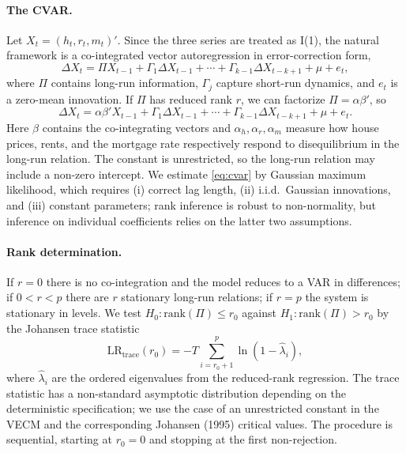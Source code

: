 \documentclass[12pt]{article}
\begin{document}
\paragraph{The CVAR.} Let $X_t = (h_t, r_t, m_t)'$. Since the three series are treated as I(1), the natural framework is a co-integrated vector autoregression in error-correction form,
\begin{equation}
    \Delta X_t = \Pi X_{t-1} + \Gamma_1 \Delta X_{t-1} + \cdots + \Gamma_{k-1}\Delta X_{t-k+1} + \mu + e_t,
\end{equation}
where $\Pi$ contains long-run information, $\Gamma_j$ capture short-run dynamics, and $e_t$ is a zero-mean innovation. If $\Pi$ has reduced rank $r$, we can factorize $\Pi = \alpha\beta'$, so
\begin{equation}
    \Delta X_t = \alpha\beta'X_{t-1} + \Gamma_1 \Delta X_{t-1} + \cdots + \Gamma_{k-1}\Delta X_{t-k+1} + \mu + e_t.
    \label{eq:cvar}
\end{equation}
Here $\beta$ contains the co-integrating vectors and $\alpha_h, \alpha_r, \alpha_m$ measure how house prices, rents, and the mortgage rate respectively respond to disequilibrium in the long-run relation. The constant is unrestricted, so the long-run relation may include a non-zero intercept. We estimate \eqref{eq:cvar} by Gaussian maximum likelihood, which requires (i) correct lag length, (ii) i.i.d.\ Gaussian innovations, and (iii) constant parameters; rank inference is robust to non-normality, but inference on individual coefficients relies on the latter two assumptions.

\paragraph{Rank determination.} If $r=0$ there is no co-integration and the model reduces to a VAR in differences; if $0<r<p$ there are $r$ stationary long-run relations; if $r=p$ the system is stationary in levels. We test $H_0: \text{rank}(\Pi)\leq r_0$ against $H_1: \text{rank}(\Pi)>r_0$ by the Johansen trace statistic
\[
\mathrm{LR}_{\mathrm{trace}}(r_0) = -T\sum_{i=r_0+1}^{p}\ln(1-\hat{\lambda}_i),
\]
where $\hat\lambda_i$ are the ordered eigenvalues from the reduced-rank regression. The trace statistic has a non-standard asymptotic distribution depending on the deterministic specification; we use the case of an unrestricted constant in the VECM and the corresponding Johansen (1995) critical values. The procedure is sequential, starting at $r_0=0$ and stopping at the first non-rejection.
\end{document}
